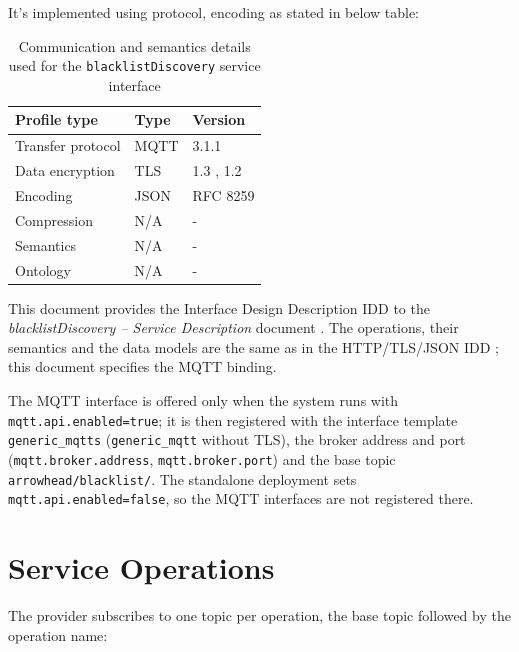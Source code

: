 \documentclass[a4paper]{arrowhead}
\begin{document}
It's implemented using protocol, encoding as stated in below table:
\begin{table}[ht!]
  \centering
  \begin{tabular}{|l|l|l|}
    \hline
    \rowcolor{gray!33} Profile type & Type & Version \\ \hline
    Transfer protocol & MQTT & 3.1.1 \cite{mqtt311} \\ \hline
    Data encryption & TLS & 1.3 \cite{rfc8446}, 1.2 \cite{rfc5246} \\ \hline
    Encoding & JSON & RFC 8259 \cite{rfc8259} \\ \hline
    Compression & N/A & - \\ \hline
    Semantics & N/A & - \\ \hline
    Ontology & N/A & - \\ \hline
  \end{tabular}
  \caption{Communication and semantics details used for the \texttt{blacklistDiscovery} service interface}
  \label{tab:comunication_semantics_profile}
\end{table}

This document provides the Interface Design Description IDD to the \textit{blacklistDiscovery -- Service Description} document \cite{bl-blacklistDiscovery-sd}.
The operations, their semantics and the data models are the same as in the HTTP/TLS/JSON IDD \cite{bl-blacklistDiscovery-http-idd}; this document specifies the MQTT binding.

The MQTT interface is offered only when the system runs with \texttt{mqtt.api.enabled=true}; it is then registered with the interface template \texttt{generic\_\allowbreak{}mqtts} (\texttt{generic\_\allowbreak{}mqtt} without TLS), the broker address and port (\texttt{mqtt.\allowbreak{}broker.\allowbreak{}address}, \texttt{mqtt.\allowbreak{}broker.\allowbreak{}port}) and the base topic \texttt{arrowhead/\allowbreak{}blacklist/\allowbreak{}}. The standalone deployment sets \texttt{mqtt.\allowbreak{}api.\allowbreak{}enabled=\allowbreak{}false}, so the MQTT interfaces are not registered there.

\newpage

\section{Service Operations}
\label{sec:operations}

The provider subscribes to one topic per operation, the base topic followed by the operation name:
\end{document}
